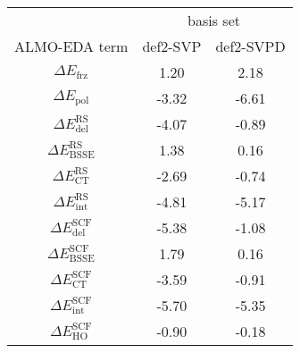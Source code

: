 \begin{tabular}{ccc}
\toprule
& \multicolumn{2}{c}{basis set} \\
ALMO-EDA term & def2-SVP & def2-SVPD \\
\midrule
\(\Delta E_{\textrm{frz}}\) & 1.20 & 2.18 \\
\(\Delta E_{\textrm{pol}}\) & -3.32 & -6.61 \\
\(\Delta E_{\textrm{del}}^{\textrm{RS}}\) & -4.07 & -0.89 \\
\(\Delta E_{\textrm{BSSE}}^{\textrm{RS}}\) & 1.38 & 0.16 \\
\(\Delta E_{\textrm{CT}}^{\textrm{RS}}\) & -2.69 & -0.74 \\
\(\Delta E_{\textrm{int}}^{\textrm{RS}}\) & -4.81 & -5.17 \\
\(\Delta E_{\textrm{del}}^{\textrm{SCF}}\) & -5.38 & -1.08 \\
\(\Delta E_{\textrm{BSSE}}^{\textrm{SCF}}\) & 1.79 & 0.16 \\
\(\Delta E_{\textrm{CT}}^{\textrm{SCF}}\) & -3.59 & -0.91 \\
\(\Delta E_{\textrm{int}}^{\textrm{SCF}}\) & -5.70 & -5.35 \\
\(\Delta E_{\textrm{HO}}^{\textrm{SCF}}\) & -0.90 & -0.18 \\
\bottomrule
\end{tabular}